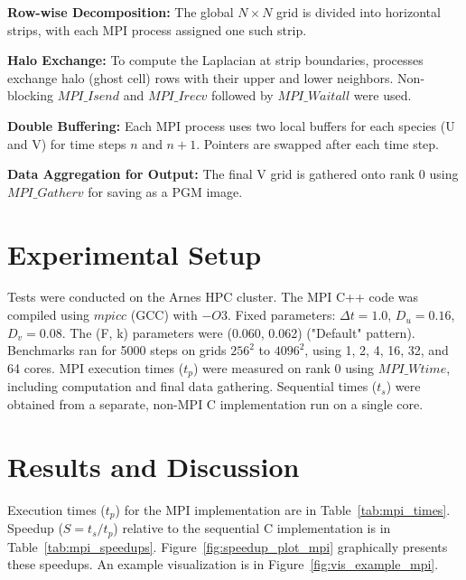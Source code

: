 \documentclass[9pt]{IEEEtran} %
\begin{document}
\textbf{Row-wise Decomposition:} The global $N \times N$ grid is divided into horizontal strips, with each MPI process assigned one such strip.

\textbf{Halo Exchange:} To compute the Laplacian at strip boundaries, processes exchange halo (ghost cell) rows with their upper and lower neighbors. Non-blocking $MPI\_Isend$ and $MPI\_Irecv$ followed by $MPI\_Waitall$ were used.

\textbf{Double Buffering:} Each MPI process uses two local buffers for each species (U and V) for time steps $n$ and $n+1$. Pointers are swapped after each time step.

\textbf{Data Aggregation for Output:} The final V grid is gathered onto rank 0 using $MPI\_Gatherv$ for saving as a PGM image.

\section{Experimental Setup}
\label{sec:setup}

Tests were conducted on the Arnes HPC cluster. The MPI C++ code was compiled using $mpicc$ (GCC) with $-O3$. Fixed parameters: $\Delta t = 1.0$, $D_u = 0.16$, $D_v = 0.08$. The (F, k) parameters were (0.060, 0.062) ("Default" pattern). Benchmarks ran for 5000 steps on grids $256^2$ to $4096^2$, using 1, 2, 4, 16, 32, and 64 cores. MPI execution times ($t_p$) were measured on rank 0 using $MPI\_Wtime$, including computation and final data gathering. Sequential times ($t_s$) were obtained from a separate, non-MPI C implementation run on a single core. 

\section{Results and Discussion}
\label{sec:results_discussion}

Execution times ($t_p$) for the MPI implementation are in Table~\ref{tab:mpi_times}. Speedup ($S = t_s/t_p$) relative to the sequential C implementation is in Table~\ref{tab:mpi_speedups}. Figure~\ref{fig:speedup_plot_mpi} graphically presents these speedups. An example visualization is in Figure~\ref{fig:vis_example_mpi}.
\end{document}
